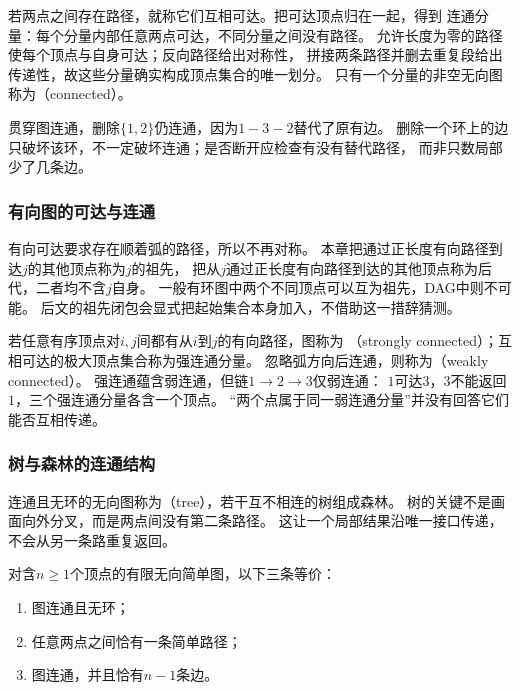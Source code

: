 若两点之间存在路径，就称它们互相可达。把可达顶点归在一起，得到
连通分量：每个分量内部任意两点可达，不同分量之间没有路径。
允许长度为零的路径使每个顶点与自身可达；反向路径给出对称性，
拼接两条路径并删去重复段给出传递性，故这些分量确实构成顶点集合的唯一划分。
只有一个分量的非空无向图称为（connected）。

贯穿图连通，删除\(\{1,2\}\)仍连通，因为\(1-3-2\)替代了原有边。
删除一个环上的边只破坏该环，不一定破坏连通；是否断开应检查有没有替代路径，
而非只数局部少了几条边。

\subsubsection{有向图的可达与连通}

有向可达要求存在顺着弧的路径，所以不再对称。
本章把通过正长度有向路径到达\(j\)的其他顶点称为\(j\)的祖先，
把从\(j\)通过正长度有向路径到达的其他顶点称为后代，二者均不含\(j\)自身。
一般有环图中两个不同顶点可以互为祖先，DAG中则不可能。
后文的祖先闭包会显式把起始集合本身加入，不借助这一措辞猜测。

若任意有序顶点对\(i,j\)间都有从\(i\)到\(j\)的有向路径，图称为
（strongly connected）；互相可达的极大顶点集合称为强连通分量。
忽略弧方向后连通，则称为（weakly connected）。
强连通蕴含弱连通，但链\(1\to2\to3\)仅弱连通：
\(1\)可达\(3\)，\(3\)不能返回\(1\)，三个强连通分量各含一个顶点。
“两个点属于同一弱连通分量”并没有回答它们能否互相传递。

\subsubsection{树与森林的连通结构}

连通且无环的无向图称为（tree），若干互不相连的树组成森林。
树的关键不是画面向外分叉，而是两点间没有第二条路径。
这让一个局部结果沿唯一接口传递，不会从另一条路重复返回。

\begin{theorem}[树的等价刻画]
  \label{thm:graph-theory-tree-characterizations}
  对含\(n\geq1\)个顶点的有限无向简单图，以下三条等价：
  \begin{enumerate}
    \item 图连通且无环；
    \item 任意两点之间恰有一条简单路径；
    \item 图连通，并且恰有\(n-1\)条边。
  \end{enumerate}
\end{theorem}

